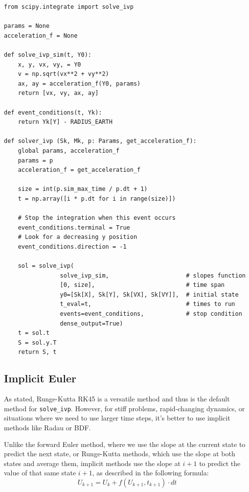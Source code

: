 \documentclass[runningheads]{llncs}
\begin{document}
 
\begin{verbatim}
from scipy.integrate import solve_ivp

params = None
acceleration_f = None

def solve_ivp_sim(t, Y0):
    x, y, vx, vy, = Y0
    v = np.sqrt(vx**2 + vy**2)
    ax, ay = acceleration_f(Y0, params)
    return [vx, vy, ax, ay]

def event_conditions(t, Yk):
    return Yk[Y] - RADIUS_EARTH

def solver_ivp (Sk, Mk, p: Params, get_acceleration_f):
    global params, acceleration_f
    params = p
    acceleration_f = get_acceleration_f
    
    size = int(p.sim_max_time / p.dt + 1)
    t = np.array([i * p.dt for i in range(size)])

    # Stop the integration when this event occurs
    event_conditions.terminal = True  
    # Look for a decreasing y position
    event_conditions.direction = -1   

    sol = solve_ivp(
                solve_ivp_sim,                      # slopes function
                [0, size],                          # time span
                y0=[Sk[X], Sk[Y], Sk[VX], Sk[VY]],  # initial state  
                t_eval=t,                           # times to run
                events=event_conditions,            # stop condition
                dense_output=True)  
    t = sol.t
    S = sol.y.T
    return S, t
\end{verbatim}




\subsection{Implicit Euler}
As stated, Runge-Kutta RK45 is a versatile method and thus is the default method for \texttt{solve\_ivp}. However, for stiff problems, rapid-changing dynamics, or situations where we need to use larger time steps, it's better to use implicit methods like Radau or BDF.

Unlike the forward Euler method, where we use the slope at the current state to predict the next state, or Runge-Kutta methods, which use the slope at both states and average them, implicit methods use the slope at \(i+1\) to predict the value of that same state \(i+1\), as described in the following formula:
\begin{equation}
    U_{k+1} = U_k + f(U_{k+1}, t_{k+1}) \cdot dt
\end{equation}
\end{document}

